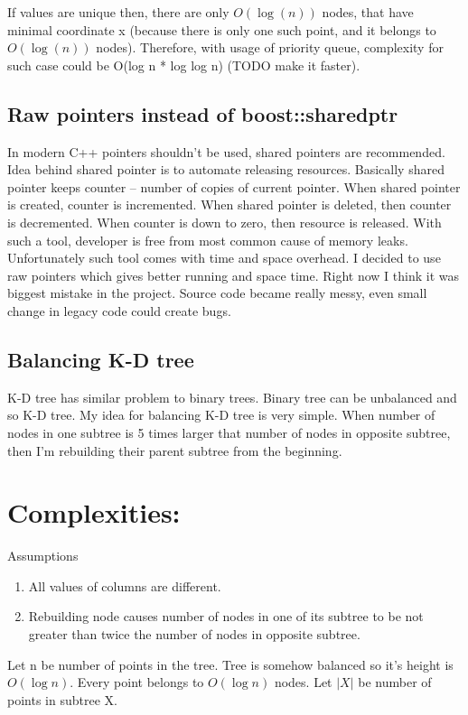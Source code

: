 \documentclass{llncs}
\begin{document}
If values are unique then, there are only $O(\log (n))$ nodes, that have minimal coordinate x (because there is only one such point, and it belongs to $O(\log (n))$ nodes). Therefore, with
usage of priority queue, complexity for such case could be O(log n * log log n) (TODO make it faster).

\subsection{Raw pointers instead of boost::shared\textunderscore ptr}

In modern C++ pointers shouldn't be used, shared pointers are recommended. Idea behind shared pointer is to automate releasing resources. Basically shared pointer keeps counter – number of copies of current pointer. When shared pointer is created, counter is incremented. When shared pointer is deleted, then counter is decremented. When counter is down to zero, then resource is released. With such a tool, developer is free from most common cause of memory leaks. Unfortunately such tool comes with time and space overhead. I decided to use raw pointers which gives better running and space time.
Right now I think it was biggest mistake in the project. Source code became really messy, even small change in legacy code could create bugs.

\subsection{Balancing K-D tree}
K-D tree has similar problem to binary trees. Binary tree can be unbalanced and so K-D tree. My idea for balancing K-D tree is very simple. When number of nodes in one subtree is 5 times larger that number of nodes in opposite subtree, then I'm rebuilding their parent subtree from the beginning.

\section{Complexities:}

Assumptions
\begin{enumerate}
\item All values of columns are different.
\item Rebuilding node causes number of nodes in one of its subtree to be not greater than twice the number of nodes in opposite subtree.
\end{enumerate}

Let n be number of points in the tree. Tree is somehow balanced so it's height is $O(\log n)$. Every point belongs to $O(\log n)$ nodes. Let $|X|$ be number of points in subtree X.
\end{document}
